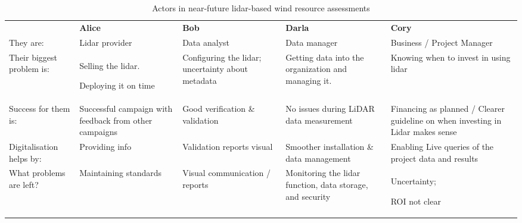 \begin{table*}[!h]
 \centering
 \caption{Actors in near-future lidar-based wind resource assessments}
 \begin{tabular}{@{}|p{}|p{}|p{}|p{}|p{}|@{}}
 \rowcolor{Task32Blue2} & \textbf{Alice} & \textbf{Bob} & \textbf{Darla} & \textbf{Cory} \\
They are: & 
    Lidar provider & 
    Data analyst & 
    Data manager & 
    Business / Project Manager \\
Their biggest problem is: & 
    Selling the lidar. 
    
    Deploying it on time &
    Configuring the lidar; uncertainty about metadata & 
    Getting data into the organization and managing it. & 
    Knowing when to invest in using lidar \\
Success for them is: & 
    Successful campaign with feedback from other campaigns & 
    Good verification \& validation & 
    No issues during LiDAR data measurement & 
    Financing as planned / Clearer guideline on when investing in Lidar makes sense \\
Digitalisation helps by: & 
    Providing info & 
    Validation reports visual & 
    Smoother installation \& data management &
    Enabling Live queries of the project data and results \\
What problems are left? & 
    Maintaining standards & 
    Visual communication / reports & 
    Monitoring the lidar function, data storage, and security & 
    Uncertainty;

    ROI not clear 
\end{tabular}
\label{tab:01_wra_future}
\end{table*}